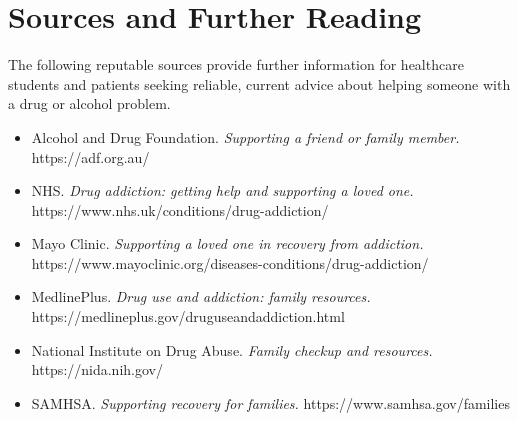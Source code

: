 \section*{Sources and Further Reading}
The following reputable sources provide further information for healthcare students and patients seeking reliable, current advice about helping someone with a drug or alcohol problem.
\begin{itemize}
    \item Alcohol and Drug Foundation. \textit{Supporting a friend or family member.} https://adf.org.au/
    \item NHS. \textit{Drug addiction: getting help and supporting a loved one.} https://www.nhs.uk/conditions/drug-addiction/
    \item Mayo Clinic. \textit{Supporting a loved one in recovery from addiction.} https://www.mayoclinic.org/diseases-conditions/drug-addiction/
    \item MedlinePlus. \textit{Drug use and addiction: family resources.} https://medlineplus.gov/druguseandaddiction.html
    \item National Institute on Drug Abuse. \textit{Family checkup and resources.} https://nida.nih.gov/
    \item SAMHSA. \textit{Supporting recovery for families.} https://www.samhsa.gov/families
\end{itemize}
